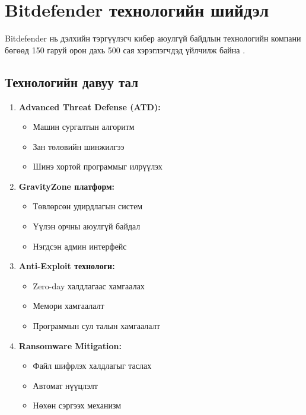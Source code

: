 \documentclass[main.tex]{subfiles}
\begin{document}
\section{Bitdefender технологийн шийдэл}

Bitdefender нь дэлхийн тэргүүлэгч кибер аюулгүй байдлын технологийн компани бөгөөд 150 гаруй орон дахь 500 сая хэрэглэгчдэд үйлчилж байна \cite{4}.

\subsection{Технологийн давуу тал}

\begin{enumerate}
    \item \textbf{Advanced Threat Defense (ATD):}
    \begin{itemize}
        \item Машин сургалтын алгоритм
        \item Зан төлөвийн шинжилгээ
        \item Шинэ хортой программыг илрүүлэх
    \end{itemize}
    
    \item \textbf{GravityZone платформ:}
    \begin{itemize}
        \item Төвлөрсөн удирдлагын систем
        \item Үүлэн орчны аюулгүй байдал
        \item Нэгдсэн админ интерфейс
    \end{itemize}
    
    \item \textbf{Anti-Exploit технологи:}
    \begin{itemize}
        \item Zero-day халдлагаас хамгаалах
        \item Мемори хамгаалалт
        \item Программын сул талын хамгаалалт
    \end{itemize}
    
    \item \textbf{Ransomware Mitigation:}
    \begin{itemize}
        \item Файл шифрлэх халдлагыг таслах
        \item Автомат нүүцлэлт
        \item Нөхөн сэргээх механизм
    \end{itemize}
\end{enumerate}
\end{document}
